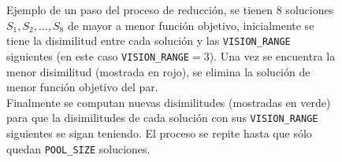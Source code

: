 \begin{figure}
\caption{Ejemplo de un paso del proceso de reducción, se tienen 8 soluciones $S_1,S_2,...,S_8$ de mayor a menor función objetivo, inicialmente se tiene la disimilitud entre cada solución y las \texttt{VISION\_RANGE} siguientes (en este caso \texttt{VISION\_RANGE}$=3$). Una vez se encuentra la menor disimilitud (mostrada en rojo), se elimina la solución de menor función objetivo del par.\\ Finalmente se computan nuevas disimilitudes (mostradas en verde) para que la disimilitudes de cada solución con sus \texttt{VISION\_RANGE} siguientes se sigan teniendo. El proceso se repite hasta que sólo quedan \texttt{POOL\_SIZE} soluciones.}
\label{fig:reduction}
\end{figure}
